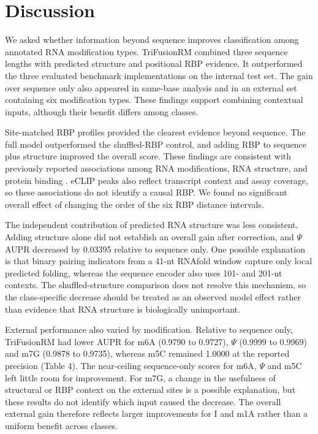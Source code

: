 \documentclass[unnumsec,webpdf,contemporary,large]{oup-authoring-template}
\begin{document}
\section{Discussion}

We asked whether information beyond sequence improves classification among annotated RNA modification types. TriFusionRM combined three sequence lengths with predicted structure and positional RBP evidence. It outperformed the three evaluated benchmark implementations on the internal test set. The gain over sequence only also appeared in same-base analysis and in an external set containing six modification types. These findings support combining contextual inputs, although their benefit differs among classes.

Site-matched RBP profiles provided the clearest evidence beyond sequence. The full model outperformed the shuffled-RBP control, and adding RBP to sequence plus structure improved the overall score. These findings are consistent with previously reported associations among RNA modifications, RNA structure, and protein binding \citep{ref21}. eCLIP peaks also reflect transcript context and assay coverage, so these associations do not identify a causal RBP. We found no significant overall effect of changing the order of the six RBP distance intervals.

The independent contribution of predicted RNA structure was less consistent. Adding structure alone did not establish an overall gain after correction, and $\Psi$ AUPR decreased by 0.03395 relative to sequence only. One possible explanation is that binary pairing indicators from a 41-nt RNAfold window capture only local predicted folding, whereas the sequence encoder also uses 101- and 201-nt contexts. The shuffled-structure comparison does not resolve this mechanism, so the class-specific decrease should be treated as an observed model effect rather than evidence that RNA structure is biologically unimportant.

External performance also varied by modification. Relative to sequence only, TriFusionRM had lower AUPR for m6A (0.9790 to 0.9727), $\Psi$ (0.9999 to 0.9969) and m7G (0.9878 to 0.9735), whereas m5C remained 1.0000 at the reported precision (Table 4). The near-ceiling sequence-only scores for m6A, $\Psi$ and m5C left little room for improvement. For m7G, a change in the usefulness of structural or RBP context on the external sites is a possible explanation, but these results do not identify which input caused the decrease. The overall external gain therefore reflects larger improvements for I and m1A rather than a uniform benefit across classes.
\end{document}
